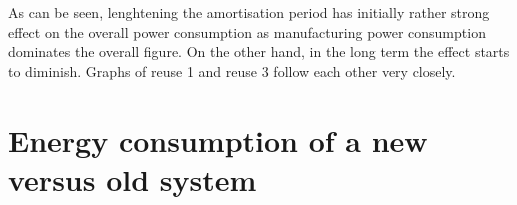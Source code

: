 \documentclass{article}
\begin{document}
As can be seen, lenghtening the amortisation period has initially rather strong effect on the overall power consumption as manufacturing power consumption dominates the overall figure. On the other hand, in the long term the effect starts to diminish. Graphs of reuse 1 and reuse 3 follow each other very closely.

\newpage
\section{Energy consumption of a new versus old system}
\end{document}
